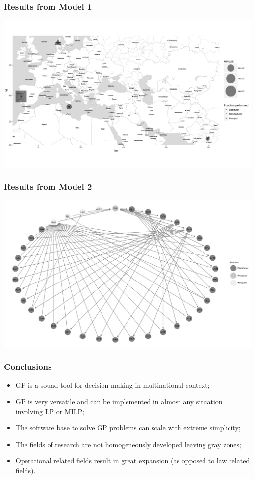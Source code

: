 \documentclass{beamer}
\begin{document}
\begin{frame}
	\frametitle{Results from Model 1}
	\includegraphics[width=1\linewidth]{allocation_map.png}
\end{frame}

\begin{frame}
	\frametitle{Results from Model 2}
	\includegraphics[width=1\linewidth]{network.png}
\end{frame}

\begin{frame}
	\frametitle{Conclusions}
	\begin{itemize}
		\item GP is a sound tool for decision making in multinational context;
\item GP is very versatile and can be implemented in almost any situation involving LP or MILP;
\item The software base to solve GP problems can scale with extreme simplicity;
\item The fields of research are not homogeneously developed leaving gray zones;
\item Operational related fields result in great expansion (as opposed to law related fields).
\end{itemize}
\end{frame}
\end{document}
